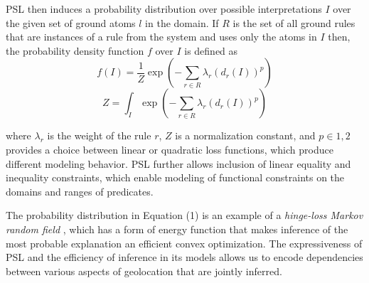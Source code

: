 PSL then induces a probability distribution over possible interpretations $\mathit{I}$ over the given set of ground atoms $\mathit{l} $ in the domain. 
If $\mathit{R}$ is the set of all ground rules that are instances of a rule from the system and uses only the atoms in  $\mathit{I}$ then,
the probability density function $\mathit{f}$ over $\mathit{I}$ is defined as
\begin{equation}
\label{eq:contimn1}
    f (I) = \frac{1}{Z} \exp \left(-\sum_{r\in R} \lambda_r (d_r(I))^p \right)
\end{equation}
\begin{equation}
\label{eq:contimn2}
	Z = \int_{I} \exp \left( -\sum_{r\in R} \lambda_r (d_r(I))^p \right)
\end{equation}
{\color{red}
where $\lambda_r$ is the weight of the rule $r$, $Z$ is a normalization
constant, and $p \in {1, 2}$ provides a choice between linear or
quadratic loss functions, which produce different modeling behavior. PSL
further allows inclusion of linear equality and inequality constraints,
which enable modeling of functional constraints on the domains and
ranges of predicates. 

The probability distribution in Equation (1) is an example of a
\emph{hinge-loss Markov random field} \cite{bach:uai13}, which has a
form of energy function that makes inference of the most probable
explanation an efficient convex optimization. The expressiveness of PSL
and the efficiency of inference in its models allows us to encode
dependencies between various aspects of geolocation that are jointly
inferred.
}
%

